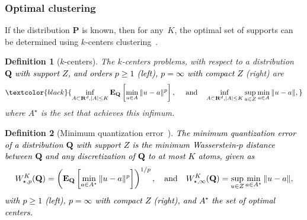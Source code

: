 \documentclass[12pt]{article}
\newcommand{\ie}{{\it i.e.}}
\newcommand{\reals}{{\bf R}}
\newcommand{\prob}{{\mathbf P}}
\newcommand{\Expect}{{\mbox{\bf E}}}
\newcommand{\barp}{p}
\newcommand{\ld}{W}
\newtheorem{proposition}{Proposition}[section]
\newtheorem{definition}{Definition}[section]
\newcommand{\RC}[1]{\textcolor{black}{#1}}
\newcommand{\RC}[1]{\textcolor{blue}{#1}}
\begin{document}

\subsubsection{Optimal clustering} 
\label{sec:optimal_cluster}
If the distribution $\prob$ is known, then for any~$K$, the optimal set of supports can be determined using $k$-centers clustering~\cite[Chapter 1]{quantization}. 
\begin{definition}[$k$-centers]
    \label{def:k_center}
    The $k$-centers problems, with respect to a distribution \RC{$\mathbf{Q}$ with support $Z$, and orders $\barp \geq 1$ (left), $\barp=\infty$ with compact $Z$} (right) are
\begin{equation}
    \label{def:k_centers}
    \RC{\inf_{A \subset \reals^d, |A|\leq K}\Expect_\mathbf{Q}\left[\min_{a \in A}\|u - a\|^{\barp}\right], ~\quad\text{and}\quad \inf_{A \subset \reals^d, |A|\leq K}\sup_{u \in Z}\min_{a \in A}\|u - a\|,}
\end{equation}
where $A^\star$ is the set that achieves this infimum. 
\end{definition}

\begin{definition}[Minimum quantization error{~\cite[Chapter 1]{quantization}}]
\label{def:quantization}
\RC{The minimum quantization error of a distribution $\mathbf{Q}$ with support $Z$ is the minimum Wasserstein-$\barp$ distance between $\mathbf{Q}$ and any discretization of $\mathbf{Q}$ to at most $K$ atoms, given as
$$\ld^K_{\star,\barp}(\mathbf{Q}) = \left(\Expect_{\mathbf{Q}}\left[\min_{a \in A^\star}\|u - a\|^{\barp}\right]\right)^{1/{\barp}},\quad\text{and} \quad \ld^K_{\star,\infty}(\mathbf{Q})  = \sup_{u\in Z}\min_{a \in A^\star}\|u - a\|,$$
    \RC{with $\barp \geq 1$ (left), $\barp=\infty$ with compact $Z$} (right), and $A^\star$ the set of optimal centers. }
\end{definition}
\end{document}
